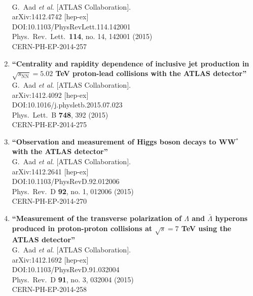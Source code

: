 \documentclass{article}
\begin{document}
\begin{enumerate}
  \\{}G.~Aad {\it et al.} [ATLAS Collaboration].
  \\{}arXiv:1412.4742 [hep-ex]
  \\{}DOI:10.1103/PhysRevLett.114.142001
  \\{}Phys.\ Rev.\ Lett.\  {\bf 114}, no. 14, 142001 (2015)
  \\{}CERN-PH-EP-2014-257
\item%
{\bf ``Centrality and rapidity dependence of inclusive jet production in $\sqrt{s_\mathrm{NN}} = 5.02$ TeV proton-lead collisions with the ATLAS detector''}
  \\{}G.~Aad {\it et al.} [ATLAS Collaboration].
  \\{}arXiv:1412.4092 [hep-ex]
  \\{}DOI:10.1016/j.physletb.2015.07.023
  \\{}Phys.\ Lett.\ B {\bf 748}, 392 (2015)
  \\{}CERN-PH-EP-2014-275
\item%
{\bf ``Observation and measurement of Higgs boson decays to WW$^*$ with the ATLAS detector''}
  \\{}G.~Aad {\it et al.} [ATLAS Collaboration].
  \\{}arXiv:1412.2641 [hep-ex]
  \\{}DOI:10.1103/PhysRevD.92.012006
  \\{}Phys.\ Rev.\ D {\bf 92}, no. 1, 012006 (2015)
  \\{}CERN-PH-EP-2014-270
\item%
{\bf ``Measurement of the transverse polarization of $\Lambda$ and $\bar{\Lambda}$ hyperons produced in proton-proton collisions at $\sqrt{s}=7$ TeV using the ATLAS detector''}
  \\{}G.~Aad {\it et al.} [ATLAS Collaboration].
  \\{}arXiv:1412.1692 [hep-ex]
  \\{}DOI:10.1103/PhysRevD.91.032004
  \\{}Phys.\ Rev.\ D {\bf 91}, no. 3, 032004 (2015)
  \\{}CERN-PH-EP-2014-258

\end{enumerate}
\end{document}
